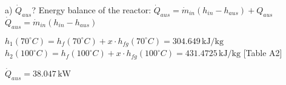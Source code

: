 a) \( \dot{Q}_{aus} \)?  
Energy balance of the reactor:  
\( \dot{Q}_{aus} = \dot{m}_{in} (h_{in} - h_{aus}) + Q_{aus} \)  
\( \dot{Q}_{aus} = \dot{m}_{in} (h_{in} - h_{aus}) \)  

\( h_1 (70^\circ C) = h_f (70^\circ C) + x \cdot h_{fg} (70^\circ C) = 304.649 \, \text{kJ/kg} \)  
\( h_2 (100^\circ C) = h_f (100^\circ C) + x \cdot h_{fg} (100^\circ C) = 431.4725 \, \text{kJ/kg} \)  
[Table A2]  

\( \dot{Q}_{aus} = 38.047 \, \text{kW} \)